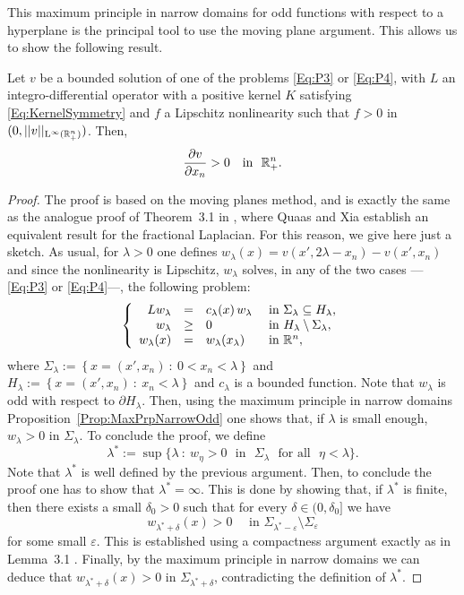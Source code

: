 This maximum principle in narrow domains for odd functions with respect to a hyperplane is the principal tool to use the moving plane argument. This allows us to show the following result.


\begin{proposition}
	\label{Prop:MonotonyHalfSpace}
	Let $v$ be a bounded solution of one of the problems \eqref{Eq:P3} or \eqref{Eq:P4}, with $L$ an integro-differential operator with a positive kernel $K$ satisfying \eqref{Eq:KernelSymmetry} and $f$ a Lipschitz nonlinearity such that $f>0$ in $(0,||v||_{\mathrm{L}^{\infty}(\mathbb{R}^n_+)})$. Then,
	$$ 
	\frac{\partial v}{\partial x_n} > 0 \,\,\,\, \text{ in } \,\,\mathbb{R}^n_+.
	$$
\end{proposition}


\begin{proof}
	The proof is based on the moving planes method, and is exactly the same as the analogue proof of Theorem~3.1 in \cite{QuaasXia}, where Quaas and Xia establish an equivalent result for the fractional Laplacian. For this reason, we give here just a sketch. As usual, for $\lambda > 0$ one defines $w_\lambda (x) = v(x',2\lambda - x_n)-v(x',x_n)$ and since the nonlinearity is Lipschitz, $w_\lambda$ solves, in any of the two cases ---\eqref{Eq:P3} or \eqref{Eq:P4}---, the following problem:
	$$
	\left\{\begin{array}{rcll} 
	L w_\lambda &=& c_\lambda(x)\,w_\lambda  &\textrm{ in } \Sigma_\lambda\subseteq H_\lambda,\\ 
	w_\lambda &\geq& 0 &\textrm{ in } H_\lambda\setminus\Sigma_\lambda,\\ 
	w_\lambda(x) &=& w_\lambda(x_\lambda) &\textrm{ in } \mathbb{R}^n, 
	\end{array} \right. 
	$$
	where $\Sigma_\lambda := \left\{ x = (x',x_n) \ : \ 0<x_n<\lambda \right\}$ and $H_\lambda := \left\{ x = (x',x_n) \ : \ x_n<\lambda \right\}$ and $c_\lambda$ is a bounded function. Note that $w_\lambda$ is odd with respect to $\partial H_\lambda$. Then, using the maximum principle in narrow domains  Proposition~\ref{Prop:MaxPrpNarrowOdd} one shows that, if $\lambda$ is small enough, $w_\lambda>0$ in $\Sigma_\lambda$. To conclude the proof, we define 
	$$ 
	\lambda^* := \sup\{\lambda \ : \ w_\eta>0 \,\, \text{ in } \,\, \Sigma_\lambda \,\, \text{ for all } \,\, \eta<\lambda\}. 
	$$
	Note that $\lambda^*$ is well defined by the previous argument. Then, to conclude the proof one has to show that $\lambda^*=\infty$. This is done by showing that, if $\lambda^*$ is finite, then there exists a small $\delta_0 > 0$ such that for every $\delta \in (0,\delta_0]$ we have
	$$
	w_{\lambda^* +  \delta} (x) > 0 \quad \text{ in } \Sigma_{\lambda^*-\varepsilon}\setminus \Sigma_{\varepsilon}
	$$
	for some small $\varepsilon$.
	This is established using a compactness argument exactly as in Lemma~3.1 \cite{QuaasXia}. Finally, by the maximum principle in narrow domains we can deduce that $w_{\lambda^* +  \delta} (x) > 0 $ in $\Sigma_{\lambda^*+\delta}$, contradicting the definition of $\lambda^*$.
\end{proof}













